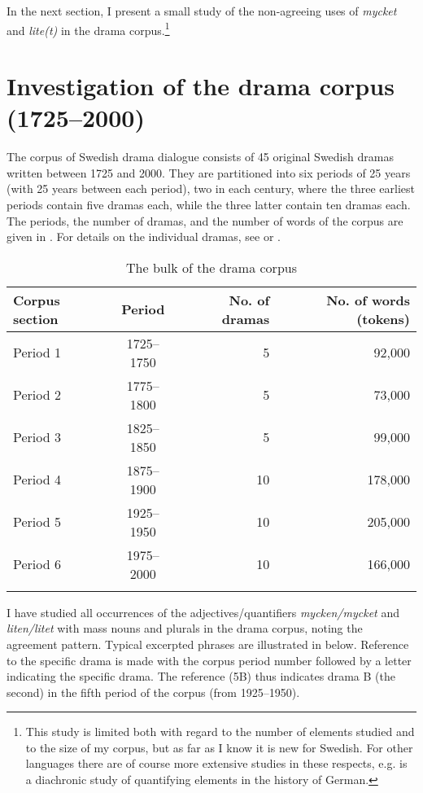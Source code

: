 \documentclass[output=paper]{langscibook}
\begin{document}
In the next section, I present a small study of the non-agreeing uses of \textit{mycket} and \textit{lite(t)} in the drama corpus.\footnote{This study is limited both with regard to the number of elements studied and to the size of my corpus, but as far as I know it is new for Swedish. For other languages there are of course more extensive studies in these respects, e.g. \citet{RoehrsSapp2016} is a diachronic study of quantifying elements in the history of German.} 


\section{Investigation of the drama corpus (1725–2000)}\label{sec:delsing:3}


The corpus of Swedish drama dialogue consists of 45 original Swedish dramas written between 1725 and 2000. They are partitioned into six periods of 25 years (with 25 years between each period), two in each century, where the three earliest periods contain five dramas each, while the three latter contain ten dramas each. The periods, the number of dramas, and the number of words of the corpus are given in . For details on the individual dramas, see \citet{MarttalaStromquist2001} or \citet[38–39 and Appendix 1]{Stroh-Wollin2008}.



\begin{table}
\caption{The bulk of the drama corpus\label{tab:delsing:2}}
\begin{tabular}{lcrr}
\lsptoprule
Corpus section & Period & No. of dramas & No. of words (tokens)\\
\midrule
Period 1 & 1725–1750 & 5 & 92,000\\
Period 2 & 1775–1800 & 5 & 73,000\\
Period 3 & 1825–1850 & 5 & 99,000\\
Period 4 & 1875–1900 & 10 & 178,000\\
Period 5 & 1925–1950 & 10 & 205,000\\
Period 6 & 1975–2000 & 10 & 166,000\\
\lspbottomrule
\end{tabular}
\end{table}

I have studied all occurrences of the adjectives/quantifiers \textit{mycken/mycket} and \textit{liten/litet} with mass nouns and plurals in the drama corpus, noting the agreement pattern. Typical excerpted phrases are illustrated in  below. Reference to the specific drama is made with the corpus period number followed by a letter indicating the specific drama. The reference (5B) thus indicates drama B (the second) in the fifth period of the corpus (from 1925–1950).
\end{document}
